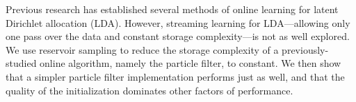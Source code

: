 Previous research has established several methods of online learning for latent Dirichlet allocation (LDA).  However, streaming learning for LDA---allowing only one pass over the data and constant storage complexity---is not as well explored.  We use reservoir sampling to reduce the storage complexity of a previously-studied online algorithm, namely the particle filter, to constant. We then show that a simpler particle filter implementation performs just as well, and that the quality of the initialization dominates other factors of performance.
